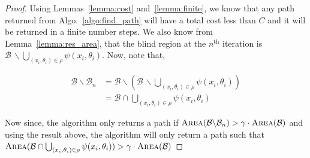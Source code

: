 \documentclass[letterpaper, 10pt, conference]{ieeeconf}
\newcommand{\Area}[0]{\ensuremath{{\textsc{Area}}}}
\newcommand{\B}[0]{\ensuremath{{{\mathcal{B}}}}}
\begin{document}
\begin{proof}

    Using Lemmas~\ref{lemma:cost} and~\ref{lemma:finite}, we know that any path
    returned from Algo.~\ref{algo:find_path} will have a total cost less than
    $C$ and it will be returned in a finite number steps.  We also know from
    Lemma~\ref{lemma:res_area}, that the blind region at the $n^{\text{th}}$
    iteration is $\B \, \backslash
        \bigcup_{(x_i,
            \theta_i) \in
    \rho} \psi(x_i, \theta_i)$. Now, note that,

    \begin{align*}
        \B \backslash \B_n &= \B \backslash (\B \, \backslash
        \bigcup_{(x_i, \theta_i) \in \rho} \psi(x_i, \theta_i)) \\
        &= \B \cap
        \bigcup_{(x_i, \theta_i) \in \rho} \psi(x_i, \theta_i)
    \end{align*}

    Now since, the algorithm only returns a path if $\Area(\B \backslash
    \B_n) > \gamma \cdot \Area(\B)$ and using the result above, the algorithm
    will only return a path such that $\Area(\B \cap
    \bigcup_{(x_i, \theta_i) \in \rho} \psi(x_i, \theta_i)) >
    \gamma \cdot \Area(\B)$

\end{proof}


\end{document}
